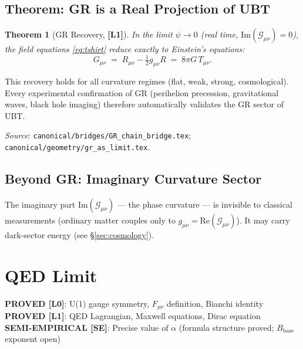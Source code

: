 \documentclass[12pt,a4paper]{article}
\newtheorem{theorem}{Theorem}[section]
\newcommand{\Lone}{\textbf{[L1]}}
\begin{document}
\subsection{Theorem: GR is a Real Projection of UBT}

\begin{theorem}[GR Recovery, \Lone]
In the limit $\psi \to 0$ (real time, $\mathrm{Im}(\mathcal{G}_{\mu\nu}) = 0$),
the field equations \eqref{eq:tshirt} reduce exactly to Einstein's equations:
\begin{equation}
  G_{\mu\nu} \;=\; R_{\mu\nu} - \tfrac{1}{2}g_{\mu\nu}R \;=\; 8\pi G\,T_{\mu\nu}.
\end{equation}
\end{theorem}

\noindent This recovery holds for all curvature regimes (flat, weak, strong,
cosmological).  Every experimental confirmation of GR (perihelion precession,
gravitational waves, black hole imaging) therefore automatically validates the
GR sector of UBT.

\textit{Source}: \texttt{canonical/bridges/GR\_chain\_bridge.tex};
\texttt{canonical/geometry/gr\_as\_limit.tex}.

\subsection{Beyond GR: Imaginary Curvature Sector}

The imaginary part $\mathrm{Im}(\mathcal{G}_{\mu\nu})$ — the phase curvature
— is invisible to classical measurements (ordinary matter couples only to
$g_{\mu\nu} = \mathrm{Re}(\mathcal{G}_{\mu\nu})$).
It may carry dark-sector energy (see \S\ref{sec:cosmology}).

\section{QED Limit}
\label{sec:QED}

\begin{tcolorbox}[colback=green!5!white,colframe=green!50!black,title=QED Sector Status]
\textbf{PROVED [L0]}: U(1) gauge symmetry, $F_{\mu\nu}$ definition, Bianchi identity\\
\textbf{PROVED [L1]}: QED Lagrangian, Maxwell equations, Dirac equation\\
\textbf{SEMI-EMPIRICAL [SE]}: Precise value of $\alpha$ (formula structure proved;
$B_{\mathrm{base}}$ exponent open)
\end{tcolorbox}
\end{document}
